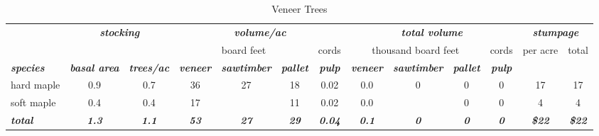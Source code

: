 \documentclass[landscape]{article}
\begin{document}
\begin{table}[H]

\caption{\label{tab:unnamed-chunk-39}Veneer Trees}
\fontsize{10}{12}\selectfont
\begin{tabular}[t]{lcccccccccccc}
\toprule
\multicolumn{1}{c}{\em{\textbf{ }}} & \multicolumn{2}{c}{\em{\textbf{stocking}}} & \multicolumn{4}{c}{\em{\textbf{volume/ac }}} & \multicolumn{4}{c}{\em{\textbf{total volume}}} & \multicolumn{2}{c}{\em{\textbf{stumpage}}} \\
\cmidrule(l{3pt}r{3pt}){2-3} \cmidrule(l{3pt}r{3pt}){4-7} \cmidrule(l{3pt}r{3pt}){8-11} \cmidrule(l{3pt}r{3pt}){12-13}
\multicolumn{3}{c}{ } & \multicolumn{3}{c}{board feet} & \multicolumn{1}{c}{cords} & \multicolumn{3}{c}{thousand board feet} & \multicolumn{1}{c}{cords} & \multicolumn{1}{c}{per acre} & \multicolumn{1}{c}{total} \\
\cmidrule(l{3pt}r{3pt}){4-6} \cmidrule(l{3pt}r{3pt}){7-7} \cmidrule(l{3pt}r{3pt}){8-10} \cmidrule(l{3pt}r{3pt}){11-11} \cmidrule(l{3pt}r{3pt}){12-12} \cmidrule(l{3pt}r{3pt}){13-13}
\rowcolor[HTML]{DCDCDC}  \em{\textbf{species}} & \em{\textbf{basal area}} & \em{\textbf{trees/ac}} & \em{\textbf{veneer}} & \em{\textbf{sawtimber}} & \em{\textbf{pallet}} & \em{\textbf{pulp}} & \em{\textbf{veneer}} & \em{\textbf{sawtimber}} & \em{\textbf{pallet}} & \em{\textbf{pulp}} & \em{\textbf{ }} & \em{\textbf{ }}\\
\midrule
\rowcolor{gray!6}  hard maple & 0.9 & 0.7 & 36 & 27 & 18 & 0.02 & 0.0 & 0 & 0 & 0 & 17 & 17\\
 
soft maple & 0.4 & 0.4 & 17 &  & 11 & 0.02 & 0.0 &  & 0 & 0 & 4 & 4\\
 
\rowcolor{gray!6}  \rowcolor[HTML]{DCDCDC}  \em{\textbf{total}} & \em{\textbf{1.3}} & \em{\textbf{1.1}} & \em{\textbf{53}} & \em{\textbf{27}} & \em{\textbf{29}} & \em{\textbf{0.04}} & \em{\textbf{0.1}} & \em{\textbf{0}} & \em{\textbf{0}} & \em{\textbf{0}} & \em{\textbf{\$22}} & \em{\textbf{\$22}}\\
\bottomrule
\end{tabular}
\end{table}
\end{document}
